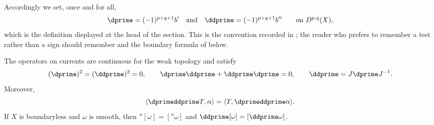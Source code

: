 Accordingly we set, once and for all,
\begin{equation}
\label{eq:ch14-dprime-sign}
 \dprime=(-1)^{p+q+1}b'
 \quad\text{and}\quad
 \ddprime=(-1)^{p+q+1}b''
 \qquad\text{on }D^{p,q}(X),
\end{equation}
which is the definition displayed at the head of the section.  This is the
convention recorded in ; the reader who prefers to
remember a test rather than a sign should remember
 and the boundary formula of
 below.

\begin{proposition}
\label{prop:current-differential-calculus}
The operators on currents are continuous for the weak topology and satisfy
\[
 (\dprime)^2=(\ddprime)^2=0,
 \qquad \dprime\ddprime+\ddprime\dprime=0,
 \qquad \ddprime=J\dprime J^{-1}.
\]
Moreover,
\[
             \langle\dprimeddprime T,\alpha\rangle
              =\langle T,\dprimeddprime\alpha\rangle.
\]
If $X$ is boundaryless and $\omega$ is smooth, then
$\dprime[\omega]=[\dprime\omega]$ and
$\ddprime[\omega]=[\ddprime\omega]$.
\end{proposition}
